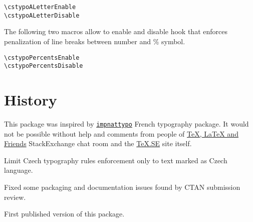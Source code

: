 \documentclass[paper=B5,DIV=calc,parskip=half]{scrartcl}
\begin{document}
\begin{lstlisting}[style=myLatexStyle]
\cstypoALetterEnable
\cstypoALetterDisable
\end{lstlisting}

The following two macros allow to enable and disable hook that enforces
penalization of line breaks between number and \% symbol.

\begin{lstlisting}[style=myLatexStyle]
\cstypoPercentsEnable
\cstypoPercentsDisable
\end{lstlisting}


\section{History}

This package was inspired by
\texttt{\href{http://www.ctan.org/pkg/impnattypo}{impnattypo}} French
typography package. It would not be possible without help and comments from
people of
\href{http://chat.stackexchange.com/rooms/41/tex-latex-and-friends}{\TeX{},
  \LaTeX{} and Friends} StackExchange chat room and the
\href{http://tex.stackexchange.com/}{\TeX.SE} site itself.

\begin{description}[style=nextline, labelwidth=4.5em, leftmargin=!, labelindent=0em]
\item[\texttt{v0.03}] Limit Czech typography rules enforcement only to text
  marked as Czech language.
\item[\texttt{v0.02}] Fixed some packaging and documentation issues found by
  CTAN submission review.
\item[\texttt{v0.01}] First published version of this package.
\end{description}
\end{document}
